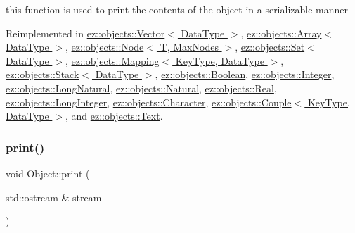 this function is used to print the contents of the object in a serializable manner 

Reimplemented in \hyperlink{classez_1_1objects_1_1Vector_a934bda76e5686f1af4a45dda39d75744}{ez\+::objects\+::\+Vector$<$ Data\+Type $>$}, \hyperlink{classez_1_1objects_1_1Array_a7f8b26dd8b96708d0a300a1f406ce336}{ez\+::objects\+::\+Array$<$ Data\+Type $>$}, \hyperlink{classez_1_1objects_1_1Node_accf427aa06dc326baa7a12497cae6045}{ez\+::objects\+::\+Node$<$ T, Max\+Nodes $>$}, \hyperlink{classez_1_1objects_1_1Set_a1a98246f459de08368b425eae3720873}{ez\+::objects\+::\+Set$<$ Data\+Type $>$}, \hyperlink{classez_1_1objects_1_1Mapping_a1233daf5c8f5d7ad9539e9d7f58703c3}{ez\+::objects\+::\+Mapping$<$ Key\+Type, Data\+Type $>$}, \hyperlink{classez_1_1objects_1_1Stack_a5df9f4c84fff1e025c094219765d0032}{ez\+::objects\+::\+Stack$<$ Data\+Type $>$}, \hyperlink{classez_1_1objects_1_1Boolean_a313c385e8ce93e19fd774882143f3a25}{ez\+::objects\+::\+Boolean}, \hyperlink{classez_1_1objects_1_1Integer_ab6035639fbee8c61086db044b731e213}{ez\+::objects\+::\+Integer}, \hyperlink{classez_1_1objects_1_1LongNatural_aae2570f931064a354df5553fd4425b90}{ez\+::objects\+::\+Long\+Natural}, \hyperlink{classez_1_1objects_1_1Natural_a53b32330fc4911b138033b37b90bc467}{ez\+::objects\+::\+Natural}, \hyperlink{classez_1_1objects_1_1Real_a337dff4013876656aeb1aa98ecc9864b}{ez\+::objects\+::\+Real}, \hyperlink{classez_1_1objects_1_1LongInteger_a9c4f7a8c3e60ab678b43f818a07540d5}{ez\+::objects\+::\+Long\+Integer}, \hyperlink{classez_1_1objects_1_1Character_ab72c114740fab4824d691d6219e07a67}{ez\+::objects\+::\+Character}, \hyperlink{classez_1_1objects_1_1Couple_a7d64b5194ac6092bc553d97fedbe23ad}{ez\+::objects\+::\+Couple$<$ Key\+Type, Data\+Type $>$}, and \hyperlink{classez_1_1objects_1_1Text_a7d35b931601e4fb476cd168744bc03d6}{ez\+::objects\+::\+Text}.

\mbox{\label{classez_1_1objects_1_1Object_a9e20f39a78163f67f000576149d858b3}} 
\subsubsection{\texorpdfstring{print()}{print()}}
{\footnotesize\ttfamily void Object\+::print (\begin{DoxyParamCaption}\item[{std\+::ostream \&}]{stream }\end{DoxyParamCaption})\hspace{0.3cm}{\ttfamily [virtual]}}

